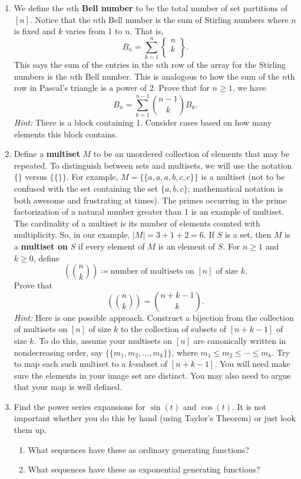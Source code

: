 \documentclass[11pt]{article}%
\theoremstyle{definition}
\newcommand{\stirling}[2]{
  \displaystyle \left\{\begin{matrix}#1  \\#2  \\ \end{matrix}\right\}}
\begin{document}
\begin{enumerate}
\item We define the $n$th \textbf{Bell number} to be the total number of set partitions of $[n]$.  Notice that the $n$th Bell number is the sum of Stirling numbers where $n$ is fixed and $k$ varies from 1 to $n$.  That is,
\[
B_n=\sum_{k=1}^n\stirling{n}{k}.
\]
This says the sum of the entries in the $n$th row of the array for the Stirling numbers is the $n$th Bell number.  This is analogous to how the sum of the $n$th row in Pascal's triangle is a power of 2. Prove that for $n\geq 1$, we have
\[
B_n=\sum_{k=1}^{n-1}\binom{n-1}{k}B_k.
\]
\emph{Hint:} There is a block containing 1. Consider cases based on how many elements this block contains.
\item Define a \textbf{multiset} $M$ to be an unordered collection of elements that may be repeated.  To distinguish between sets and multisets, we will use the notation $\{\}$ versus $\{\{\}\}$. For example, $M=\{\{a,a,a,b,c,c\}\}$ is a multiset (not to be confused with the set containing the set $\{a,b,c\}$; mathematical notation is both awesome and frustrating at times). The primes occurring in the prime factorization of a natural number greater than 1 is an example of multiset.  The cardinality of a multiset is its number of elements counted with multiplicity.  So, in our example, $|M|=3+1+2=6$.  If $S$ is a set, then $M$ is a \textbf{multiset on} $S$ if every element of $M$ is an element of $S$. For $n\geq 1$ and $k\geq 0$, define
\[
\left(\binom{n}{k}\right)\coloneqq \text{number of multisets on }[n]\text{ of size }k.
\]
Prove that
\[
\left(\binom{n}{k}\right)=\binom{n+k-1}{k}.
\]
\emph{Hint:} Here is one possible approach.  Construct a bijection from the collection of multisets on $[n]$ of size $k$ to the collection of subsets of $[n+k-1]$ of size $k$. To do this, assume your multisets on $[n]$ are canonically written in nondecreasing order, say $\{\{m_1,m_2,\ldots,m_k\}\}$, where $m_1\leq m_2\leq \cdots \leq m_k$.  Try to map each such multiset to a $k$-subset of $[n+k-1]$.  You will need make sure the elements in your image set are distinct.  You may also need to argue that your map is well defined.

\item Find the power series expansions for $\sin(t)$ and $\cos(t)$. It is not important whether you do this by hand (using Taylor's Theorem) or just look them up.  
\begin{enumerate}
\item What sequences have these as ordinary generating functions?
\item What sequences have these as exponential generating functions?
\end{enumerate}


\end{enumerate}
\end{document}
